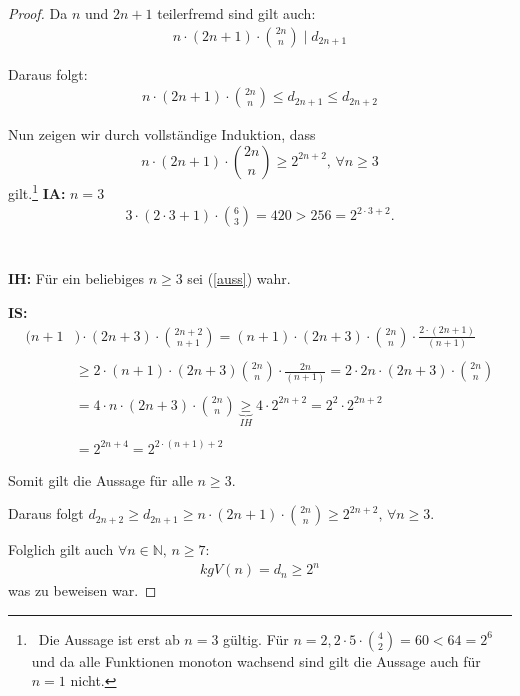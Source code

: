 \documentclass[12pt,oneside]{article}
\theoremstyle{remark}
\theoremstyle{definition}
\begin{document}
\begin{proof}
Da $n $ und $2n + 1$ teilerfremd sind gilt auch:
\begin{align*}
    n \cdot (2n + 1) \cdot {2n \choose n} \mid d_{2n + 1}
\end{align*}

Daraus folgt:
\begin{align*}
    n \cdot (2n + 1) \cdot {2n \choose n} \leq d_{2n + 1} \leq d_{2n + 2}
\end{align*}

Nun zeigen wir durch vollständige Induktion, dass 
\begin{equation}\label{auss}
    n \cdot (2n + 1) \cdot {2n \choose n} \geq 2^{2n + 2}, \, \forall n \geq 3
\end{equation}
gilt.\footnote{$\,$ Die Aussage ist erst ab $n = 3$ gültig. Für $n = 2, 2 \cdot 5 \cdot {4 \choose 2} = 60 < 64 = 2^{6} $ und da alle Funktionen monoton wachsend sind gilt die Aussage auch für $n = 1$ nicht.}\newline\newline
\textbf{IA:} $n = 3$
\begin{align*}
    3 \cdot (2 \cdot 3 + 1) \cdot { 6 \choose 3} = 420 > 256 = 2^{2 \cdot 3 + 2}.
\end{align*}
\\
\\
\textbf{IH:} Für ein beliebiges $n \geq 3$ sei (\ref{auss}) wahr.\newline\newline

\textbf{IS:}
\begin{align*}
    (n + 1&) \cdot (2n + 3) \cdot {2n + 2 \choose n + 1} =(n + 1) \cdot (2n + 3) \cdot {2n \choose n} \cdot \frac{2 \cdot (2n + 1)}{(n + 1)} \\
    \\
    &\geq 2 \cdot (n + 1) \cdot (2n + 3) {2n \choose n} \cdot \frac{2n}{(n + 1)} = 2 \cdot 2n \cdot (2n + 3) \cdot {2n \choose n} \\
    \\ 
    &= 4 \cdot n \cdot (2n + 3) \cdot {2n \choose n} \underbrace{\geq}_{IH} 4 \cdot 2^{2n + 2} = 2^2 \cdot 2^{2n + 2}\\
    \\
    &= 2^{2n + 4} = 2^{2 \cdot (n + 1) + 2} 
\end{align*}

Somit gilt die Aussage für alle $n \geq 3$.\newline\newline 

Daraus folgt $d_{2n + 2} \geq d_{2n + 1} \geq  n \cdot (2n + 1) \cdot {2n \choose n} \geq 2^{2n + 2}, \, \forall n \geq 3$.\newline\newline

Folglich gilt auch $\forall n \in \mathbb{N}, \, n \geq 7$:
\begin{align*}
    kgV(n)= d_{n} \geq 2^{n}
\end{align*}
was zu beweisen war.
\end{proof}
\end{document}
